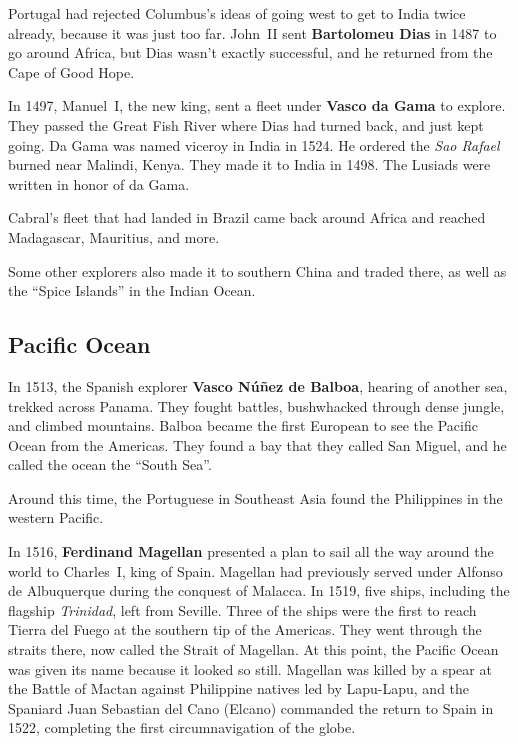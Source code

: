 Portugal had rejected Columbus's ideas of going west to get to India twice already,
because it was just too far.
John~II sent \textbf{Bartolomeu Dias} in 1487 to go around Africa,
but Dias wasn't exactly successful, and he returned from the Cape of Good Hope.

In 1497, Manuel~I, the new king, sent a fleet under \textbf{Vasco da Gama} to explore.
They passed the Great Fish River where Dias had turned back, and just kept going.
Da Gama was named viceroy in India in 1524.
He ordered the \textit{Sao Rafael} burned near Malindi, Kenya.
They made it to India in 1498.
The Lusiads were written in honor of da Gama.

Cabral's fleet that had landed in Brazil came back around Africa
and reached Madagascar, Mauritius, and more.

Some other explorers also made it to southern China and traded there,
as well as the ``Spice Islands'' in the Indian Ocean.

\subsection*{Pacific Ocean}

In 1513, the Spanish explorer \textbf{Vasco N\'u\~nez de Balboa},
hearing of another sea, trekked across Panama.
They fought battles, bushwhacked through dense jungle, and climbed mountains.
Balboa became the first European to see the Pacific Ocean from the Americas.
They found a bay that they called San Miguel, and he called the ocean the ``South Sea''.

Around this time, the Portuguese in Southeast Asia found the Philippines in the western Pacific.

In 1516, \textbf{Ferdinand Magellan} presented a plan
to sail all the way around the world to Charles~I, king of Spain.
Magellan had previously served under Alfonso de Albuquerque during the conquest of Malacca.
In 1519, five ships, including the flagship \textit{Trinidad}, left from Seville.
Three of the ships were the first to reach Tierra del Fuego at the southern tip of the Americas.
They went through the straits there, now called the Strait of Magellan.
At this point, the Pacific Ocean was given its name because it looked so still.
Magellan was killed by a spear at the Battle of Mactan against Philippine natives led by Lapu-Lapu,
and the Spaniard Juan Sebastian del Cano (Elcano) commanded the return to Spain in 1522,
completing the first circumnavigation of the globe.

